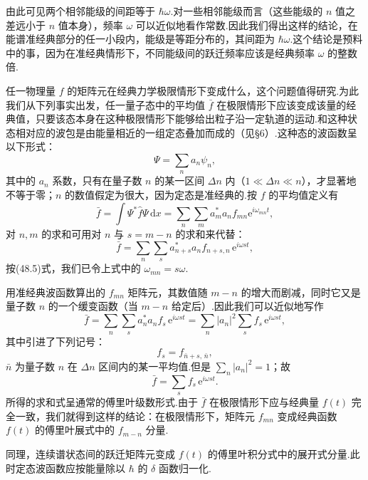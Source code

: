 由此可见两个相邻能级的间距等于 $\hbar\omega$.对一些相邻能级而言（这些能级的 $n$ 值之差远小于 $n$ 值本身），频率 $\omega$ 可以近似地看作常数.因此我们得出这样的结论，在能谱准经典部分的任一小段内，能级是等距分布的，其间距为 $\hbar\omega$.这个结论是预料中的事，因为在准经典情形下，不同能级间的跃迁频率应该是经典频率 $\omega$ 的整数倍.

任一物理量 $f$ 的矩阵元在经典力学极限情形下变成什么，这个问题值得研究.为此我们从下列事实出发，任一量子态中的平均值 $\bar{f}$ 在极限情形下应该变成该量的经典值，只要该态本身在这种极限情形下能够给出粒子沿一定轨道的运动.和这种状态相对应的波包是由能量相近的一组定态叠加而成的（见§6）.这种态的波函数呈以下形式：
\begin{equation*}
  \Psi=\sum_n a_n\psi_n,
\end{equation*}
其中的 $a_n$ 系数，只有在量子数 $n$ 的某一区间 $\Delta n$ 内（$1\ll\Delta n\ll n$），才显著地不等于零；$n$ 的数值假定为很大，因为定态是准经典的.按 $f$ 的平均值定义有
\begin{equation*}
  \bar{f}=\int\Psi^*\hat{f}\Psi\,\mathrm{d}x
  =\sum_n\sum_m a_m^*a_n f_{mn}\mathrm{e}^{i\omega_{mn}t},
\end{equation*}
对 $n,m$ 的求和可用对 $n$ 与 $s=m-n$ 的求和来代替：
\begin{equation*}
  \bar{f}=\sum_n\sum_s a_{n+s}^*a_n f_{n+s,n}\,\mathrm{e}^{i\omega st},
\end{equation*}
按(48.5)式，我们已令上式中的 $\omega_{mn}=s\omega$.

用准经典波函数算出的 $f_{mn}$ 矩阵元，其数值随 $m-n$ 的增大而剧减，同时它又是量子数 $n$ 的一个缓变函数（当 $m-n$ 给定后）.因此我们可以近似地写作
\begin{equation*}
  \bar{f}=\sum_n\sum_s a_n^*a_n f_s\,\mathrm{e}^{i\omega st}
  =\sum_n|a_n|^2\sum_s f_s\,\mathrm{e}^{i\omega st},
\end{equation*}
其中引进了下列记号：
\begin{equation*}
  f_s=f_{\bar{n}+s,\,\bar{n}},
\end{equation*}
$\bar{n}$ 为量子数 $n$ 在 $\Delta n$ 区间内的某一平均值.但是 $\sum_n|a_n|^2=1$；故
\begin{equation*}
  \bar{f}=\sum_s f_s\,\mathrm{e}^{i\omega st}.
\end{equation*}
所得的求和式呈通常的傅里叶级数形式.由于 $\bar{f}$ 在极限情形下应与经典量 $f(t)$ 完全一致，我们就得到这样的结论：在极限情形下，矩阵元 $f_{mn}$ 变成经典函数 $f(t)$ 的傅里叶展式中的 $f_{m-n}$ 分量.

同理，连续谱状态间的跃迁矩阵元变成 $f(t)$ 的傅里叶积分式中的展开式分量.此时定态波函数应按能量除以 $\hbar$ 的 $\delta$ 函数归一化.

